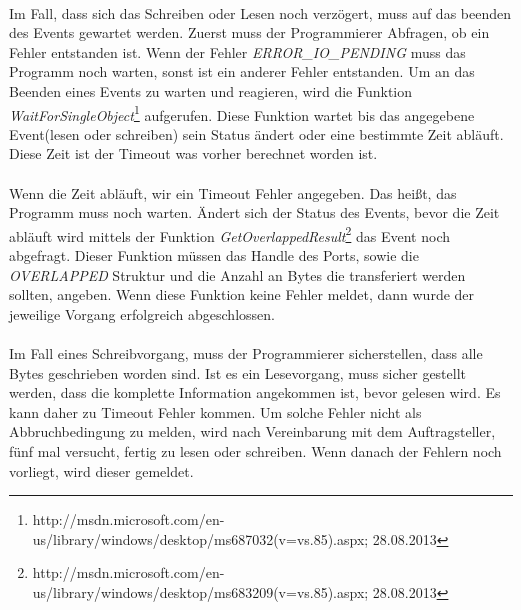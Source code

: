 \paragraph{}
Im Fall, dass sich das Schreiben oder Lesen noch verzögert, muss auf das beenden des Events gewartet werden. Zuerst muss der Programmierer Abfragen, ob ein Fehler entstanden ist. Wenn der Fehler \textit{ERROR\_IO\_PENDING} muss das Programm noch warten, sonst ist ein anderer Fehler entstanden. Um an das Beenden eines Events zu warten und reagieren, wird die Funktion \textit{WaitForSingleObject}\footnote{http://msdn.microsoft.com/en-us/library/windows/desktop/ms687032(v=vs.85).aspx; 28.08.2013} aufgerufen. Diese Funktion wartet bis das angegebene Event(lesen oder schreiben) sein Status ändert oder eine bestimmte Zeit abläuft. Diese Zeit ist der Timeout was vorher berechnet worden ist.
 
\paragraph{}
Wenn die Zeit abläuft, wir ein Timeout Fehler angegeben. Das heißt, das Programm muss noch warten. Ändert sich der Status des Events, bevor die Zeit abläuft wird mittels der Funktion \textit{GetOverlappedResult}\footnote{http://msdn.microsoft.com/en-us/library/windows/desktop/ms683209(v=vs.85).aspx; 28.08.2013} das Event noch abgefragt. Dieser Funktion müssen das Handle des Ports, sowie die \textit{OVERLAPPED} Struktur und die Anzahl an Bytes die transferiert werden sollten, angeben. Wenn diese Funktion keine Fehler meldet, dann wurde der jeweilige Vorgang erfolgreich abgeschlossen.

\paragraph{}
Im Fall eines Schreibvorgang, muss der Programmierer sicherstellen, dass alle Bytes geschrieben worden sind. Ist es ein Lesevorgang, muss sicher gestellt werden, dass die komplette Information angekommen ist, bevor gelesen wird. Es kann daher zu Timeout Fehler kommen. Um solche Fehler nicht als Abbruchbedingung zu melden, wird nach Vereinbarung mit dem Auftragsteller, fünf mal versucht, fertig zu lesen oder schreiben. Wenn danach der Fehlern noch vorliegt, wird dieser gemeldet.